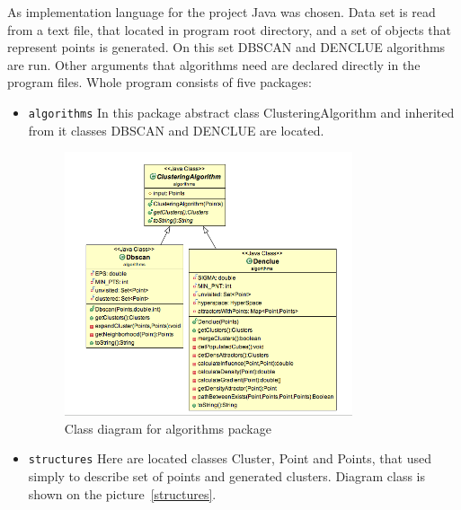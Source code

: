 \documentclass[12pt, a4paper, notitlepage, oneside]{article}
\begin{document}
As implementation language for the project Java was chosen. 
Data set is read from a text file, that located in program root directory, and a set of objects that represent points is generated. 
On this set DBSCAN and DENCLUE algorithms are run. 
Other arguments that algorithms need are declared directly in the program files. Whole program consists of five packages:

\begin{itemize}
	\item \texttt{algorithms} In this package abstract class ClusteringAlgorithm and inherited from it classes DBSCAN and DENCLUE are located. 

	\begin{figure}[!ht]
 	\centering
	\includegraphics[width=0.8\textwidth]{images/algorithms_package.png}
 	\caption[]
	{Class diagram for algorithms package}
\label{algorithms}
	\end{figure}


	\item \texttt{structures} Here are located classes Cluster, Point and Points, that used simply to describe set of points and generated clusters. Diagram class is shown on the picture~\ref{structures}.


\end{itemize}
\end{document}
